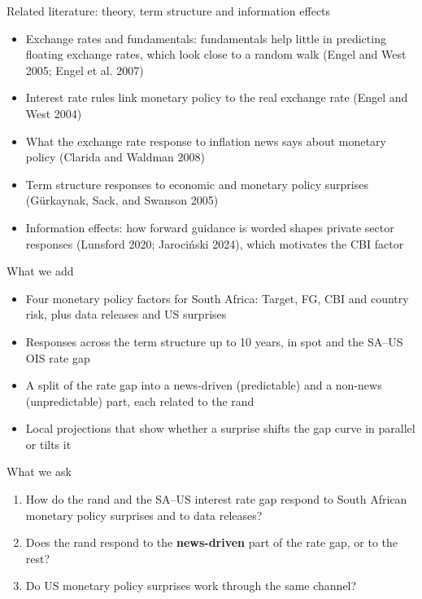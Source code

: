 \documentclass[
  ignorenonframetext,
  aspectratio=141,
]{beamer}
\providecommand{\tightlist}{%
  \setlength{\itemsep}{0pt}\setlength{\parskip}{0pt}}\usepackage{longtable,booktabs,array}
\begin{document}
\begin{frame}{Related literature: theory, term structure and information
effects}
\label{related-literature-theory-term-structure-and-information-effects}
\begin{itemize}
\tightlist
\item
  Exchange rates and fundamentals: fundamentals help little in
  predicting floating exchange rates, which look close to a random walk
  (Engel and West 2005; Engel et al. 2007)
\item
  Interest rate rules link monetary policy to the real exchange rate
  (Engel and West 2004)
\item
  What the exchange rate response to inflation news says about monetary
  policy (Clarida and Waldman 2008)
\item
  Term structure responses to economic and monetary policy surprises
  (Gürkaynak, Sack, and Swanson 2005)
\item
  Information effects: how forward guidance is worded shapes private
  sector responses (Lunsford 2020; Jarociński 2024), which motivates the
  CBI factor
\end{itemize}
\end{frame}

\begin{frame}{What we add}
\label{what-we-add}
\begin{itemize}
\tightlist
\item
  Four monetary policy factors for South Africa: Target, FG, CBI and
  country risk, plus data releases and US surprises
\item
  Responses across the term structure up to 10 years, in spot and the
  SA--US OIS rate gap
\item
  A split of the rate gap into a news-driven (predictable) and a
  non-news (unpredictable) part, each related to the rand
\item
  Local projections that show whether a surprise shifts the gap curve in
  parallel or tilts it
\end{itemize}
\end{frame}

\begin{frame}{What we ask}
\label{what-we-ask}
\begin{enumerate}
\tightlist
\item
  How do the rand and the SA--US interest rate gap respond to South
  African monetary policy surprises and to data releases?
\item
  Does the rand respond to the \textbf{news-driven} part of the rate
  gap, or to the rest?
\item
  Do US monetary policy surprises work through the same channel?
\end{enumerate}
\end{frame}
\end{document}
